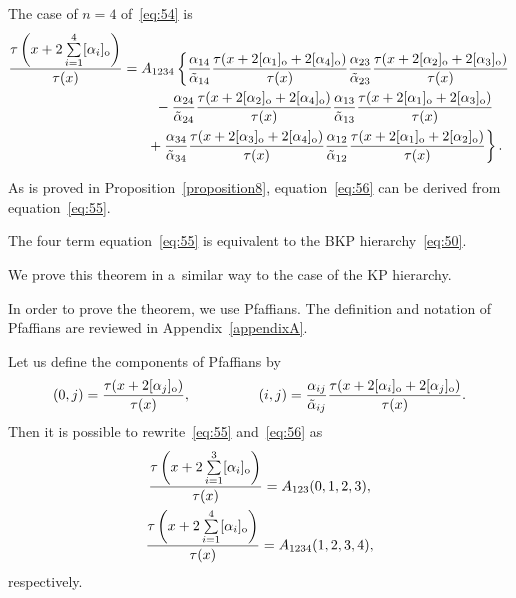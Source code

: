 \documentclass[pdftex]{sigma}
\begin{document}
\begin{example}
The case of $n=4$ of~\eqref{eq:54} is
\begin{gather}
\frac{\tau\left(x+2\sum\limits_{i=1}^{4}[\alpha_i]_{\rm o}\right)}{\tau(x)}
=A_{1234}\left\{\frac{\alpha_{14}}{\tilde{\alpha}_{14}}
\frac{\tau(x+2[\alpha_1]_{\rm o}+2[\alpha_4]_{\rm o})}{\tau(x)}\frac{\alpha_{23}}{\tilde{\alpha}_{23}}
\frac{\tau(x+2[\alpha_2]_{\rm o}+2[\alpha_3]_{\rm o})}{\tau(x)}\right.
\nonumber
\\
\hphantom{\frac{\tau\left(x+2\sum\limits_{i=1}^{4}[\alpha_i]_{\rm o}\right)}{\tau(x)}=}{}
-\frac{\alpha_{24}}{\tilde{\alpha}_{24}}\frac{\tau(x+2[\alpha_2]_{\rm o}+2[\alpha_4]_{\rm o})}{\tau(x)}
\frac{\alpha_{13}}{\tilde{\alpha}_{13}}\frac{\tau(x+2[\alpha_1]_{\rm o}+2[\alpha_3]_{\rm o})}{\tau(x)}\nonumber
\\
\left.
\hphantom{\frac{\tau\left(x+2\sum\limits_{i=1}^{4}[\alpha_i]_{\rm o}\right)}{\tau(x)}=}{}
+\frac{\alpha_{34}}{\tilde{\alpha}_{34}}\frac{\tau(x+2[\alpha_3]_{\rm o}+2[\alpha_4]_{\rm o})}{\tau(x)}\frac{\alpha_{12}
}{\tilde{\alpha}_{12}}\frac{\tau(x+2[\alpha_1]_{\rm o}+2[\alpha_2]_{\rm o})}{\tau(x)}\right\}.
\label{eq:56}
\end{gather}
\end{example}

 As is proved in Proposition~\ref{proposition8}, equation~\eqref{eq:56} can be derived from equation~\eqref{eq:55}.
\begin{theorem}\label{theorem3}
The four term equation~\eqref{eq:55} is equivalent to the BKP hierarchy~\eqref{eq:50}.
\end{theorem}

We prove this theorem in a~similar way to the case of the KP hierarchy.

In order to prove the theorem, we use Pfaf\/f\/ians.
The def\/inition and notation of Pfaf\/f\/ians are reviewed in Appendix~\ref{appendixA}.

Let us def\/ine the components of Pfaf\/f\/ians by
\begin{gather*}%
(0,j)=\frac{\tau(x+2[\alpha_j]_{\rm o})}{\tau(x)},\qquad \hskip1cm(i,j)=\frac{\alpha_{ij}}{\tilde{\alpha}_{ij}}
\frac{\tau(x+2[\alpha_i]_{\rm o}+2[\alpha_j]_{\rm o})}{\tau(x)}.
\end{gather*}
Then it is possible to rewrite~\eqref{eq:55} and~\eqref{eq:56} as
\begin{gather}
\frac{\tau\left(x+2\sum\limits_{i=1}^{3}[\alpha_i]_{\rm o}\right)}{\tau(x)}=A_{123}(0,1,2,3),
\label{eq:58}
\\
\frac{\tau\left(x+2\sum\limits_{i=1}^{4}[\alpha_i]_{\rm o}\right)}{\tau(x)}=A_{1234}(1,2,3,4),
\label{eq:59}
\end{gather}
respectively.
\end{document}

